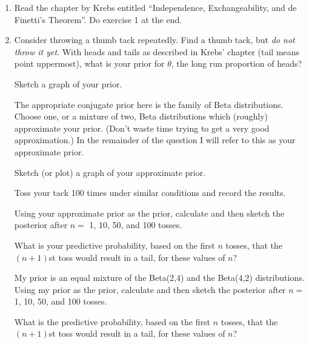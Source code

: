 \documentclass[12pt]{article}
\def\t{\theta}
\begin{document}
\begin{enumerate}
%
%
%
%
%

\item
 Read the chapter by Krebs entitled ``Independence, Exchangeability,
and de Finetti's Theorem''.   Do exercise 1 at the end.



\item  Consider throwing a thumb tack repeatedly. Find a thumb tack, but {\it do not throw it yet}. With heads and tails as described in Krebs' chapter (tail means point uppermost), what is your prior for $\t$, the long run proportion of heads?  

Sketch a graph of your prior.

The appropriate conjugate prior here is the family of Beta distributions.  Choose one, or a mixture of two, Beta distributions which (roughly) approximate your prior.  (Don't waste time trying to get a very good approximation.)  In the remainder of the question I will refer to this as your approximate prior.

Sketch (or plot) a graph of your approximate prior.

Toss your tack 100 times under similar conditions and record the results.

Using your approximate prior as the prior, calculate and then sketch the posterior after $n=$ 1, 10, 50, and 100 tosses.  

What is your predictive probability, based on the first $n$ tosses, that the $(n+1)$st toss would result in a tail, for these values of $n$?

My prior is an equal mixture of the Beta(2,4) and the Beta(4,2) distributions.
Using my prior as the prior, calculate and then sketch the posterior after $n=$ 1, 10, 50, and 100 tosses.  

What is the predictive probability, based on the first $n$ tosses, that the $(n+1)$st toss would result in a tail, for these values of $n$?


\end{enumerate}
\end{document}
